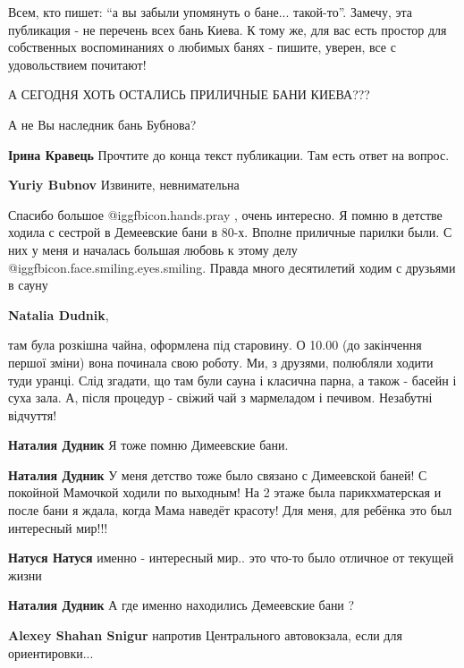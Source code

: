 \begin{itemize}
Всем, кто пишет: \enquote{а вы забыли упомянуть о бане... такой-то}. Замечу, эта
публикация - не перечень всех бань Киева. К тому же, для вас есть простор для
собственных воспоминаниях о любимых банях - пишите, уверен, все с удовольствием
почитают!


А СЕГОДНЯ ХОТЬ ОСТАЛИСЬ ПРИЛИЧНЫЕ БАНИ КИЕВА???

А не Вы наследник бань Бубнова?

\begin{itemize} %
\textbf{Ірина Кравець} Прочтите до конца текст публикации. Там есть ответ на вопрос.

\textbf{Yuriy Bubnov}  Извините, невнимательна
\end{itemize} %


Спасибо большое  @igg{fbicon.hands.pray} , очень интересно. Я помню в детстве ходила с сестрой в
Демеевские бани в 80-х. Вполне приличные парилки были. С них у меня и началась
большая любовь к этому делу @igg{fbicon.face.smiling.eyes.smiling}. Правда много десятилетий ходим с друзьями в
сауну

\begin{itemize} %
\textbf{Natalia Dudnik}, 

там була розкішна чайна, оформлена під старовину. О 10.00 (до закінчення першої
зміни) вона починала свою роботу. Ми, з друзями, полюбляли ходити туди уранці.
Слід згадати, що там були сауна і класична парна, а також - басейн і суха зала.
А, після процедур - свіжий чай з мармеладом і печивом. Незабутні відчуття!

\textbf{Наталия Дудник} Я тоже помню Димеевские бани.

\textbf{Наталия Дудник} У меня детство тоже было связано с Димеевской баней!
С покойной Мамочкой ходили по выходным!
На 2 этаже была парикхматерская и после бани я ждала, когда Мама наведёт красоту!
Для меня, для ребёнка это был интересный мир!!!

\textbf{Натуся Натуся} именно - интересный мир.. это что-то было отличное от текущей жизни

\textbf{Наталия Дудник} А где именно находились Демеевские бани ?

\begin{itemize} %
\textbf{Alexey Shahan Snigur} напротив Центрального автовокзала, если для ориентировки...


\end{itemize}
\end{itemize}
\end{itemize}
